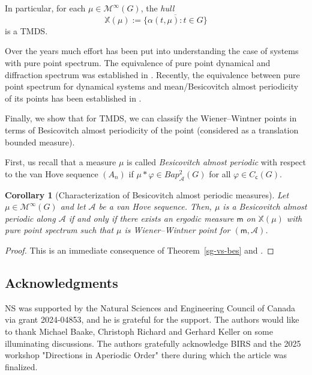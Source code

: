 \documentclass [14pt]{amsart}
\numberwithin{equation}{section}
\newcommand{\XX}{\mathbb X}
\newcommand{\cM}{{\mathcal M}}
\newcommand{\cA}{{\mathcal A}}
\newcommand{\mm}{\mathsf{m}}
\newcommand{\Cc}{C_{\mathsf{c}}}
\newcommand{\bap}{Bap}
\newtheorem{corollary}[theorem]{Corollary}
\begin{document}
In particular, for each $\mu \in \cM^\infty(G)$, the \textit{hull}
$$\XX(\mu) :=\overline{\{ \alpha(t,\mu) :t\in G\}}$$
is a TMDS.

\smallskip

Over the years much effort has been put into understanding the case of systems with pure point spectrum. The equivalence of pure point dynamical and diffraction spectrum was established in \cite{BL,LMS,Gou-1}. Recently, the equivalence between pure point spectrum for dynamical systems and mean/Besicovitch almost periodicity of its points has been established in \cite{LSS,LSS2}.

\smallskip

Finally,  we show that for TMDS, we can classify the Wiener--Wintner points in terms of Besicovitch almost periodicity of the point (considered as a translation bounded measure).

First, us recall  that a measure $\mu$ is called \textit{Besicovitch almost periodic} with respect to the van Hove sequence $(A_n)$ if $\mu\ast \varphi \in \bap_{\cA}^2(G)$ for all $\varphi \in \Cc (G)$.


\begin{corollary}[Characterization of Besicovitch almost periodic measures] Let $\mu \in \cM^\infty(G)$ and let $\cA$ be a van Hove sequence. Then,  $\mu$ is a Besicovitch almost periodic along $\cA$ if and only if there exists an ergodic measure $\mm$ on $\XX(\mu)$ with pure point spectrum such that $\mu$ is Wiener--Wintner point for $(\mm,\cA)$.
\end{corollary}
\begin{proof}
This is an immediate consequence of Theorem~\ref{sg-vs-bes} and \cite[Prop.~7.1]{LSS2}.
\end{proof}

\subsection*{Acknowledgments}
NS was supported by the Natural Sciences and Engineering Council of Canada via grant 2024-04853, and he is grateful for the support. The authors would like to
thank Michael Baake, Christoph Richard and Gerhard Keller on some illuminating discussions. The authors gratefully acknowledge BIRS and the 2025 workshop "Directions in Aperiodic Order" there during which the article was finalized.
\end{document}
